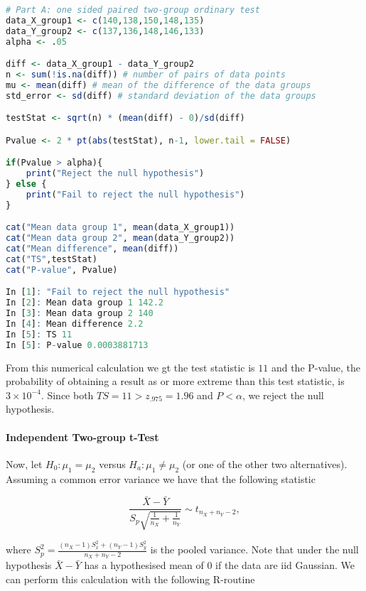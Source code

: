 \documentclass{homework}
\begin{document}
\begin{lstlisting}[language=R]
# Part A: one sided paired two-group ordinary test 
data_X_group1 <- c(140,138,150,148,135)
data_Y_group2 <- c(137,136,148,146,133)
alpha <- .05

diff <- data_X_group1 - data_Y_group2
n <- sum(!is.na(diff)) # number of pairs of data points
mu <- mean(diff) # mean of the difference of the data groups
std_error <- sd(diff) # standard deviation of the data groups 

testStat <- sqrt(n) * (mean(diff) - 0)/sd(diff) 

Pvalue <- 2 * pt(abs(testStat), n-1, lower.tail = FALSE) 

if(Pvalue > alpha){
    print("Reject the null hypothesis")
} else {
    print("Fail to reject the null hypothesis")
}

cat("Mean data group 1", mean(data_X_group1))
cat("Mean data group 2", mean(data_Y_group2))
cat("Mean difference", mean(diff))
cat("TS",testStat)
cat("P-value", Pvalue)

In [1]: "Fail to reject the null hypothesis"
In [2]: Mean data group 1 142.2
In [3]: Mean data group 2 140
In [4]: Mean difference 2.2
In [5]: TS 11
In [5]: P-value 0.0003881713
\end{lstlisting}

From this numerical calculation we gt the test statistic is $11$ and the P-value, the probability of obtaining a result as or more extreme than this test statistic, is $3\times 10^{-4}$. Since both $TS = 11 > z_{.975} = 1.96$ and $P < \alpha$, we reject the null hypothesis. \\

\paragraph{\textbf{Independent Two-group t-Test}}

Now, let $H_0 : \mu_1 = \mu_2$ versus $H_a: \mu_1 \neq \mu_2$ (or one of the other two alternatives). Assuming a common error variance we have that the following statistic

$$
\frac{\bar{X}-\bar{Y}}{S_p \sqrt{\frac{1}{n_X}+\frac{1}{n_Y}}} \sim t_{n_X+n_Y-2},
$$

where $S_p^2 = \frac{(n_X-1)S_x^2 + (n_Y-1)S_y^2 }{n_X+n_Y-2}$ is the pooled variance. Note that under the null hypothesis $\bar{X}-\bar{Y}$ has a hypothesised mean of $0$ if the data are iid Gaussian. We can perform this calculation with the following R-routine 
\end{document}
